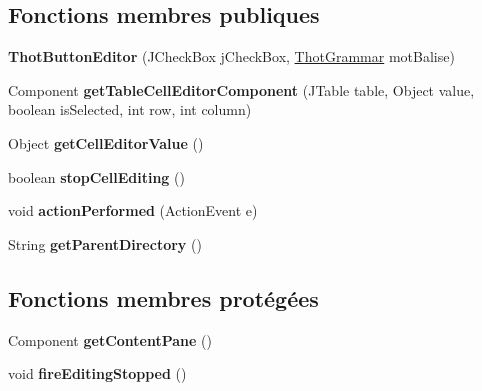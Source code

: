 \subsection*{Fonctions membres publiques}
\begin{DoxyCompactItemize}
\item 
\mbox{\label{classfr_1_1irit_1_1elipse_1_1project_1_1_thot_button_editor_acd80ec6536b192bcc69f0547fc1d14ae}} 
{\bfseries Thot\+Button\+Editor} (J\+Check\+Box j\+Check\+Box, \mbox{\hyperlink{classfr_1_1irit_1_1elipse_1_1project_1_1_thot_grammar}{Thot\+Grammar}} mot\+Balise)
\item 
\mbox{\label{classfr_1_1irit_1_1elipse_1_1project_1_1_thot_button_editor_a8c6ea00e9ea56589ce93b48af543a0da}} 
Component {\bfseries get\+Table\+Cell\+Editor\+Component} (J\+Table table, Object value, boolean is\+Selected, int row, int column)
\item 
\mbox{\label{classfr_1_1irit_1_1elipse_1_1project_1_1_thot_button_editor_a051cddf2ebcceee0fbcb6cd9a5dc722c}} 
Object {\bfseries get\+Cell\+Editor\+Value} ()
\item 
\mbox{\label{classfr_1_1irit_1_1elipse_1_1project_1_1_thot_button_editor_a0c1eb90f4aa86434f496082801272d94}} 
boolean {\bfseries stop\+Cell\+Editing} ()
\item 
\mbox{\label{classfr_1_1irit_1_1elipse_1_1project_1_1_thot_button_editor_acbd8d9dc2a0445992cff813775407b06}} 
void {\bfseries action\+Performed} (Action\+Event e)
\item 
\mbox{\label{classfr_1_1irit_1_1elipse_1_1project_1_1_thot_button_editor_acac8898da62014b3fa869eecf42f7f48}} 
String {\bfseries get\+Parent\+Directory} ()
\end{DoxyCompactItemize}
\subsection*{Fonctions membres protégées}
\begin{DoxyCompactItemize}
\item 
\mbox{\label{classfr_1_1irit_1_1elipse_1_1project_1_1_thot_button_editor_ac6582aae12ac8efe5833d473ff76287c}} 
Component {\bfseries get\+Content\+Pane} ()
\item 
\mbox{\label{classfr_1_1irit_1_1elipse_1_1project_1_1_thot_button_editor_af574e3210f6a41622f6041d49036c2c9}} 
void {\bfseries fire\+Editing\+Stopped} ()
\end{DoxyCompactItemize}
